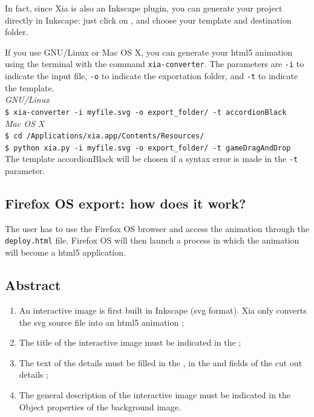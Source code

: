 In fact, since Xia is also an Inkscape plugin, you can generate your project directly 
in Inkscape: just click on , 
and choose your template and destination folder.

\begin{tip}
 If you use GNU/Linux or Mac OS X, you can generate your html5 animation
 using the terminal with the command \texttt{xia-converter}. The parameters are
 \texttt{-i} to indicate the input file, \texttt{-o} to indicate the exportation folder, and
 \texttt{-t} to indicate the template.\\
 \emph{GNU/Linux}\\
 \texttt{\$ xia-converter -i myfile.svg -o export\_folder/ -t accordionBlack}\\
 \emph{Mac OS X}\\
 \texttt{\$ cd /Applications/xia.app/Contents/Resources/}\\
 \texttt{\$ python xia.py -i myfile.svg -o export\_folder/ -t gameDragAndDrop}\\
 The template accordionBlack will be chosen if a syntax error is made in the \texttt{-t} parameter.
\end{tip}

\subsection{Firefox OS export: how does it work?}

The user has to use the Firefox OS browser and access the animation through the \texttt{deploy.html} file. 
Firefox OS will then launch a process in which the animation will become a html5 application.

\subsection{Abstract}

\begin{enumerate}
 \item An interactive image is first built in Inkscape (svg format). Xia only 
 converts the svg source file into an html5 animation ;
 \item The title of the interactive image must be indicated in the  ;
 \item The text of the details must be filled in the , 
 in the  and  fields of the cut out details ;
 \item The general description of the interactive image must be indicated in the \softmenu
{Object properties} of the background image.
\end{enumerate}

